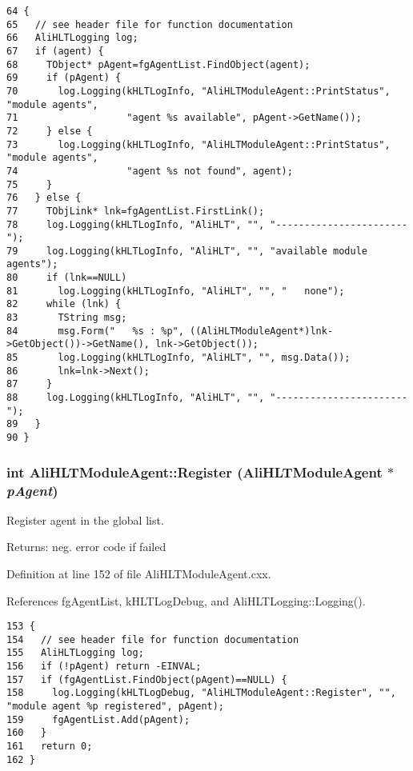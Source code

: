 \footnotesize\begin{verbatim}64 {
65   // see header file for function documentation
66   AliHLTLogging log;
67   if (agent) {
68     TObject* pAgent=fgAgentList.FindObject(agent);
69     if (pAgent) {
70       log.Logging(kHLTLogInfo, "AliHLTModuleAgent::PrintStatus", "module agents", 
71                   "agent %s available", pAgent->GetName());
72     } else {
73       log.Logging(kHLTLogInfo, "AliHLTModuleAgent::PrintStatus", "module agents", 
74                   "agent %s not found", agent);
75     }
76   } else {
77     TObjLink* lnk=fgAgentList.FirstLink();
78     log.Logging(kHLTLogInfo, "AliHLT", "", "-----------------------");
79     log.Logging(kHLTLogInfo, "AliHLT", "", "available module agents");
80     if (lnk==NULL) 
81       log.Logging(kHLTLogInfo, "AliHLT", "", "   none");
82     while (lnk) {
83       TString msg;
84       msg.Form("   %s : %p", ((AliHLTModuleAgent*)lnk->GetObject())->GetName(), lnk->GetObject());
85       log.Logging(kHLTLogInfo, "AliHLT", "", msg.Data());
86       lnk=lnk->Next();
87     }
88     log.Logging(kHLTLogInfo, "AliHLT", "", "-----------------------");
89   }
90 }
\end{verbatim}\normalsize 


\subsubsection{\setlength{\rightskip}{0pt plus 5cm}int Ali\-HLTModule\-Agent::Register ({\bf Ali\-HLTModule\-Agent} $\ast$ {\em p\-Agent})\hspace{0.3cm}{\tt  [static, private]}}\label{classAliHLTModuleAgent_h0}


Register agent in the global list. \begin{Desc}
\item[Returns:]neg. error code if failed \end{Desc}


Definition at line 152 of file Ali\-HLTModule\-Agent.cxx.

References fg\-Agent\-List, k\-HLTLog\-Debug, and Ali\-HLTLogging::Logging().

\footnotesize\begin{verbatim}153 {
154   // see header file for function documentation
155   AliHLTLogging log;
156   if (!pAgent) return -EINVAL;
157   if (fgAgentList.FindObject(pAgent)==NULL) {
158     log.Logging(kHLTLogDebug, "AliHLTModuleAgent::Register", "", "module agent %p registered", pAgent);
159     fgAgentList.Add(pAgent);
160   }
161   return 0;
162 }
\end{verbatim}\normalsize 


